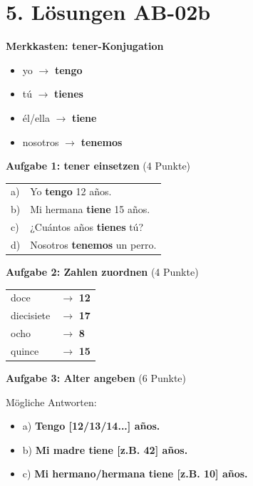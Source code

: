 \documentclass[11pt, a4paper]{article}
\newcommand{\loesung}[1]{\textcolor{loesung}{\textbf{#1}}}
\begin{document}

\section*{5. Lösungen AB-02b}

\textbf{Merkkasten: tener-Konjugation}
\begin{itemize}
    \item yo $\rightarrow$ \loesung{tengo}
    \item tú $\rightarrow$ \loesung{tienes}
    \item él/ella $\rightarrow$ \loesung{tiene}
    \item nosotros $\rightarrow$ \loesung{tenemos}
\end{itemize}

\vspace{1em}

\textbf{Aufgabe 1: tener einsetzen} (4 Punkte)

\begin{tabular}{ll}
a) & Yo \loesung{tengo} 12 años. \\
b) & Mi hermana \loesung{tiene} 15 años. \\
c) & ¿Cuántos años \loesung{tienes} tú? \\
d) & Nosotros \loesung{tenemos} un perro. \\
\end{tabular}

\vspace{1em}

\textbf{Aufgabe 2: Zahlen zuordnen} (4 Punkte)

\begin{tabular}{ll}
doce & $\rightarrow$ \loesung{12} \\
diecisiete & $\rightarrow$ \loesung{17} \\
ocho & $\rightarrow$ \loesung{8} \\
quince & $\rightarrow$ \loesung{15} \\
\end{tabular}

\vspace{1em}

\textbf{Aufgabe 3: Alter angeben} (6 Punkte)

Mögliche Antworten:
\begin{itemize}
    \item a) \loesung{Tengo [12/13/14...] años.}
    \item b) \loesung{Mi madre tiene [z.B. 42] años.}
    \item c) \loesung{Mi hermano/hermana tiene [z.B. 10] años.}
\end{itemize}
\end{document}
